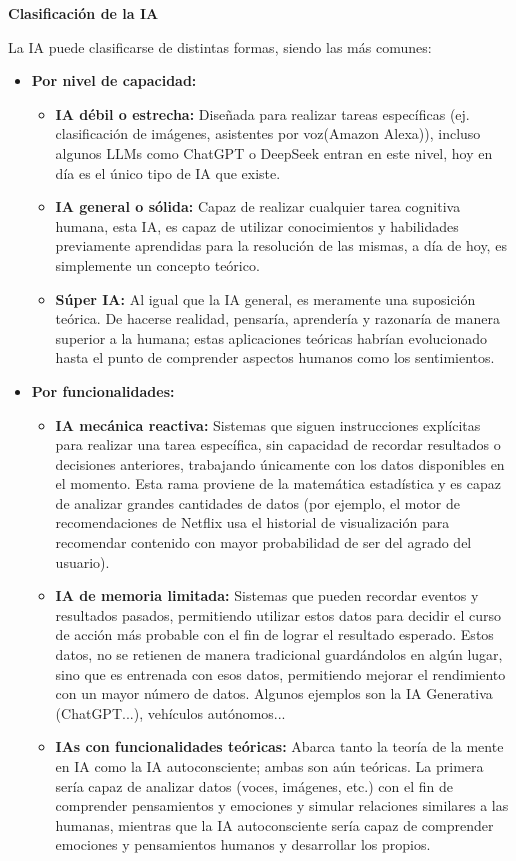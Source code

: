 \vspace{0.3cm}
\textbf{Clasificación de la IA}

La IA puede clasificarse de distintas formas, siendo las más comunes:

\begin{itemize}
    \item \textbf{Por nivel de capacidad:}
    \begin{itemize}
        \item \textbf{IA débil o estrecha:} Diseñada para realizar tareas específicas (ej. clasificación de imágenes, asistentes por voz(Amazon Alexa)), incluso algunos LLMs como ChatGPT o DeepSeek entran en este nivel, hoy en día es el único tipo de IA que existe.
        \item \textbf{IA general o sólida:} Capaz de realizar cualquier tarea cognitiva humana, esta IA, es capaz de utilizar conocimientos y habilidades previamente aprendidas para la resolución de las mismas, a día de hoy, es simplemente un concepto teórico.
        \item \textbf{Súper IA:} Al igual que la IA general, es meramente una suposición teórica. De hacerse realidad, pensaría, aprendería y razonaría de manera superior a la humana; estas aplicaciones teóricas habrían evolucionado hasta el punto de comprender aspectos humanos como los sentimientos.
    \end{itemize}

    \item \textbf{Por funcionalidades:}
    \begin{itemize}
        \item \textbf{IA mecánica reactiva:} Sistemas que siguen instrucciones explícitas para realizar una tarea específica, sin capacidad de recordar resultados o decisiones anteriores, trabajando únicamente con los datos disponibles en el momento. Esta rama proviene de la matemática estadística y es capaz de analizar grandes cantidades de datos (por ejemplo, el motor de recomendaciones de Netflix usa el historial de visualización para recomendar contenido con mayor probabilidad de ser del agrado del usuario).
        \item \textbf{IA de memoria limitada:} Sistemas que pueden recordar eventos y resultados pasados, permitiendo utilizar estos datos para decidir el curso de acción más probable con el fin de lograr el resultado esperado.
        Estos datos, no se retienen de manera tradicional guardándolos en algún lugar, sino que es entrenada con esos datos, permitiendo mejorar el rendimiento con un mayor número de datos.
        Algunos ejemplos son la IA Generativa (ChatGPT...), vehículos autónomos...
        \item \textbf{IAs con funcionalidades teóricas:} Abarca tanto la teoría de la mente en IA como la IA autoconsciente; ambas son aún teóricas. La primera sería capaz de analizar datos (voces, imágenes, etc.) con el fin de comprender pensamientos y emociones y simular relaciones similares a las humanas, mientras que la IA autoconsciente sería capaz de comprender emociones y pensamientos humanos y desarrollar los propios.
    \end{itemize}
\end{itemize}

